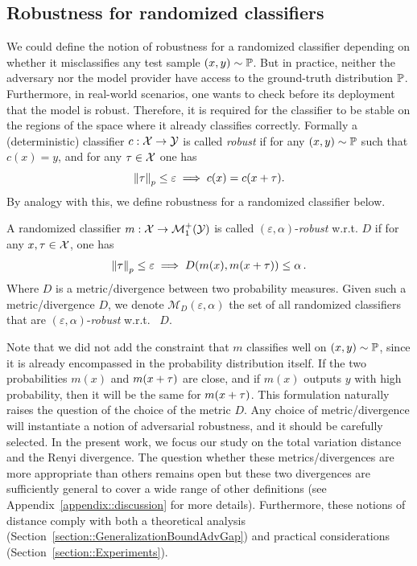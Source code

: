 \subsection{Robustness for  randomized classifiers} 
We could define the notion of robustness for a randomized classifier depending on whether it misclassifies any test sample $(x ,y) \sim \mathbb{P}$. But in practice, neither the adversary nor the model provider have access to the ground-truth distribution $\mathbb{P}$. Furthermore, in real-world scenarios, one wants to check before its deployment that the model is robust. Therefore, it is required for the classifier to be stable on the regions of the space where it already classifies correctly. Formally a (deterministic) classifier $c: \mathcal{X} \rightarrow \mathcal{Y}$ is called \emph{robust} if for any $(x , y) \sim \mathbb{P}$ such that $c(x ) = y$, and  for any ${\tau} \in \mathcal{X} $ one has  
\begin{equation}
    \norm{ {\tau} }_p \leq \varepsilon \implies c(x ) = c(x  + {\tau} ). 
\end{equation}
By analogy with this, we define robustness for a randomized classifier below.
\begin{definition}
A randomized classifier $m : \mathcal{X} \rightarrow \mathcal{M}^+_1(\mathcal{Y})$ is called $(\varepsilon,\alpha)$-\emph{robust} w.r.t. $D$ if for any $x , {\tau} \in \mathcal{X}$, one has
\begin{align*}
 \norm{\perturb}_p \leq \varepsilon \implies D\left(m (x )  ,  m (x  + \perturb)\right) \leq \alpha \equationspace.   
\end{align*}
Where $D$ is a metric/divergence between two probability measures. Given such a metric/divergence $D$, we denote $\mathcal{M}_{D}(\varepsilon,\alpha)$ the set of all randomized classifiers that are $(\varepsilon,\alpha)$-\emph{robust} w.r.t. ~$D$.
\end{definition}

Note that we did not add the constraint that $m $ classifies well on $(x ,y) \sim \mathbb{P}$, since it is already encompassed in the probability distribution itself. If the two probabilities $m (x )$ and $m (x  + {\tau})$ are close, and if $m (x )$ outputs $y$ with high probability, then it will be the same for $m (x  + {\tau})$. This formulation naturally raises the question of the choice of the metric $D$. Any choice of metric/divergence will instantiate a notion of adversarial robustness, and it should be carefully selected. In the present work, we focus our study on the total variation distance and the Renyi divergence. The question whether these metrics/divergences are more appropriate than others remains open but these two divergences are sufficiently general to cover a wide range of other definitions (see Appendix~\ref{appendix::discussion} for more details). Furthermore, these notions of distance comply with both a theoretical analysis (Section~\ref{section::GeneralizationBoundAdvGap}) and practical considerations (Section~\ref{section::Experiments}). 



